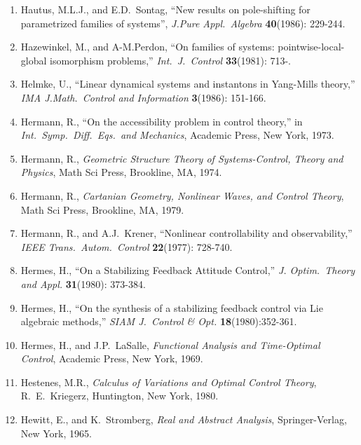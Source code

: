 \begin{enumerate}
\item
Hautus, M.L.J., and E.D.\ Sontag, ``New results on pole-shifting for
parametrized families of systems'', {\it J.Pure Appl.\ Algebra} {\bf
40}(1986): 229-244.

\item
Hazewinkel, M., and A-M.Perdon, ``On families of systems:
pointwise-local-global isomorphism problems,'' {\it Int.\ J.\ Control} {\bf
33}(1981): 713-.

\item
Helmke, U., ``Linear dynamical systems and instantons in Yang-Mills theory,''
{\it IMA J.Math.\ Control and Information} {\bf 3}(1986): 151-166.

\item
Hermann, R., ``On the accessibility problem in control theory,'' in {\it
Int.~Symp.~Diff.~Eqs.\ and Mechanics}, Academic Press, New York, 1973.

\item
Hermann, R., {\it Geometric Structure Theory of Systems-Control, Theory and
Physics}, Math Sci Press, Brookline, MA, 1974.

\item
Hermann, R., {\it Cartanian Geometry, Nonlinear Waves, and Control Theory},
Math Sci Press, Brookline, MA, 1979.

\item
Hermann, R., and A.J.\ Krener, ``Nonlinear controllability and
observability,'' {\it IEEE Trans.\ Autom.\ Control} {\bf 22}(1977): 728-740.

\item
Hermes, H., ``On a Stabilizing Feedback Attitude Control,'' {\it J.  Optim.\
Theory and Appl.} {\bf 31}(1980): 373-384.

\item
Hermes, H., ``On the synthesis of a stabilizing feedback control via Lie
algebraic methods,'' {\it SIAM J.\ Control \& Opt.} {\bf 18}(1980):352-361.

\item
Hermes, H., and J.P.\ LaSalle, {\it Functional Analysis and Time-Optimal
Control}, Academic Press, New York, 1969.

\item
Hestenes, M.R., {\it Calculus of Variations and Optimal Control Theory}, R.\
E.\ Kriegerz, Huntington, New York, 1980.

\item
Hewitt, E., and K.\ Stromberg, {\it Real and Abstract Analysis},
Springer-Verlag, New York, 1965.


\end{enumerate}
